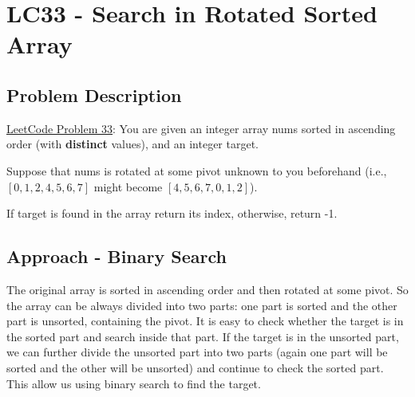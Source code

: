 \documentclass[justified]{tufte-book}
\begin{document}



\section{LC33 - Search in Rotated Sorted Array} \label{sec:lc33_search_rotated_sorted_array}
\subsection{Problem Description}
\href{https://leetcode.com/problems/search-in-rotated-sorted-array/}{LeetCode Problem 33}: You are given an integer array nums sorted in ascending order (with \textbf{distinct} values), and an integer target.

Suppose that nums is rotated at some pivot unknown to you beforehand (i.e., $[0,1,2,4,5,6,7]$ might become $[4,5,6,7,0,1,2]$).

If target is found in the array return its index, otherwise, return -1.

\subsection{Approach - Binary Search}
The original array is sorted in ascending order and then rotated at some pivot. So the array can be always divided into two parts: one part is sorted and the other part is unsorted, containing the pivot. It is easy to check whether the target is in the sorted part and search inside that part. If the target is in the unsorted part, we can further divide the unsorted part into two parts (again one part will be sorted and the other will be unsorted) and continue to check the sorted part. This allow us using binary search to find the target. 
\end{document}
